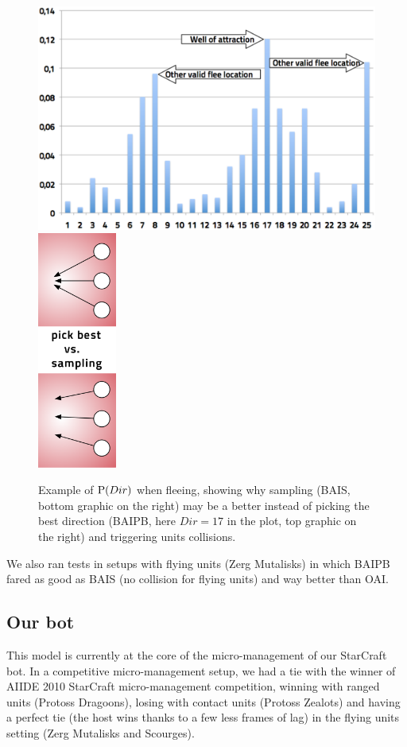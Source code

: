 \begin{figure}[h]
\includegraphics[width=12cm]{images/distDir.png}
\hspace{0.8cm}
\includegraphics[width=2.6cm]{images/flee_sample.png}
\caption{Example of $\mathrm{P}(Dir)$ when fleeing, showing why sampling (BAIS, bottom graphic on the right) may be a better instead of picking the best direction (BAIPB, here $Dir=17$ in the plot, top graphic on the right) and triggering units collisions.}
\label{fig:BayesianUnitChoice}
\end{figure}

We also ran tests in setups with flying units (Zerg Mutalisks) in which BAIPB fared as good as BAIS (no collision for flying units) and way better than OAI.

\subsection{Our bot}

This model is currently at the core of the micro-management of our StarCraft bot. In a competitive micro-management setup, we had a tie with the winner of AIIDE 2010 StarCraft micro-management competition, winning with ranged units (Protoss Dragoons), losing with contact units (Protoss Zealots) and having a perfect tie (the host wins thanks to a few less frames of lag) in the flying units setting (Zerg Mutalisks and Scourges).

